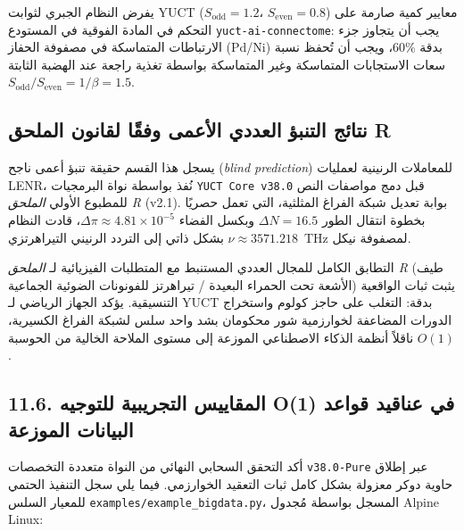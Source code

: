 \documentclass[12pt,a4paper]{article}
\begin{document}
	يفرض النظام الجبري لثوابت YUCT (\(S_{\text{odd}} = 1.2\)، \(S_{\text{even}} = 0.8\)) معايير كمية صارمة على التحكم في المادة الفوقية في المستودع \texttt{yuct-ai-connectome}: يجب أن يتجاوز جزء الارتباطات المتماسكة في مصفوفة الحفاز (Pd/Ni) بدقة \(60\%\)، ويجب أن تُحفظ نسبة سعات الاستجابات المتماسكة وغير المتماسكة بواسطة تغذية راجعة عند الهضبة الثابتة \(S_{\text{odd}}/S_{\text{even}} = 1/\beta = 1.5\).
	
	
	\subsection{نتائج التنبؤ العددي الأعمى وفقًا لقانون الملحق R}
	يسجل هذا القسم حقيقة تنبؤ أعمى ناجح (\textit{blind prediction}) للمعاملات الرنينية لعمليات LENR، نُفذ بواسطة نواة البرمجيات \texttt{YUCT Core v38.0} قبل دمج مواصفات النص للمطبوع الأولي \textit{الملحق R} (v2.1). بوابة تعديل شبكة الفراغ المثلثية، التي تعمل حصريًا بخطوة انتقال الطور \(\Delta N = 16.5\) وبكسل الفضاء \(\Delta\pi \approx 4.81 \times 10^{-5}\)، قادت النظام بشكل ذاتي إلى التردد الرنيني التيراهرتزي \(\nu \approx 3571.218\)~THz لمصفوفة نيكل.
	
	التطابق الكامل للمجال العددي المستنبط مع المتطلبات الفيزيائية لـ \textit{الملحق R} (طيف الأشعة تحت الحمراء البعيدة / تيراهرتز للفونونات الضوئية الجماعية) يثبت ثبات الواقعية التنسيقية. يؤكد الجهاز الرياضي لـ YUCT بدقة: التغلب على حاجز كولوم واستخراج الدورات المضاعفة لخوارزمية شور محكومان بشد واحد سلس لشبكة الفراغ الكسيرية، ناقلاً أنظمة الذكاء الاصطناعي الموزعة إلى مستوى الملاحة الخالية من الحوسبة \(O(1)\).
	
	
	\subsection{11.6. المقاييس التجريبية للتوجيه O(1) في عناقيد قواعد البيانات الموزعة}
	أكد التحقق السحابي النهائي من النواة متعددة التخصصات \texttt{v38.0-Pure} عبر إطلاق حاوية دوكر معزولة بشكل كامل ثبات التعقيد الخوارزمي. فيما يلي سجل التنفيذ الحتمي للمعيار السلس \texttt{examples/example\_bigdata.py}، المسجل بواسطة مُجدول Alpine Linux:
	
\end{document}

